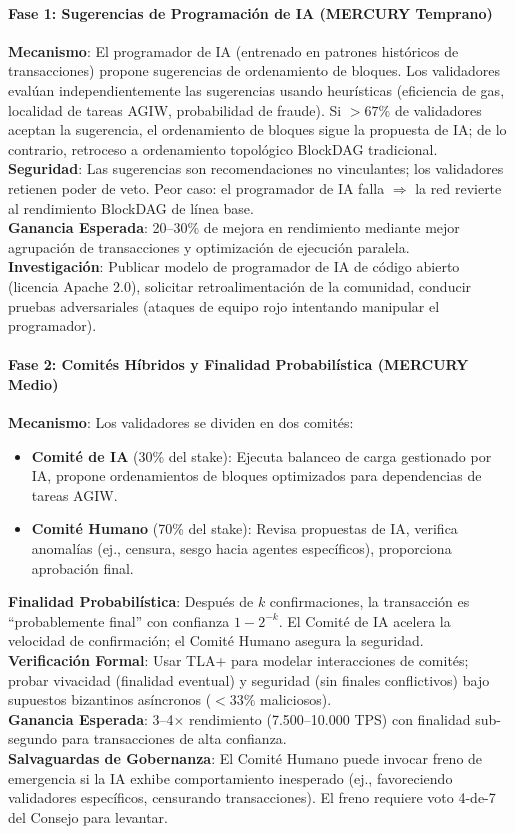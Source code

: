 \documentclass[11pt]{article}
\begin{document}
\paragraph{Fase 1: Sugerencias de Programación de IA (MERCURY Temprano)}
\textbf{Mecanismo}: El programador de IA (entrenado en patrones históricos de transacciones) propone sugerencias de ordenamiento de bloques. Los validadores evalúan independientemente las sugerencias usando heurísticas (eficiencia de gas, localidad de tareas AGIW, probabilidad de fraude). Si $>67\%$ de validadores aceptan la sugerencia, el ordenamiento de bloques sigue la propuesta de IA; de lo contrario, retroceso a ordenamiento topológico BlockDAG tradicional.\\
\textbf{Seguridad}: Las sugerencias son recomendaciones no vinculantes; los validadores retienen poder de veto. Peor caso: el programador de IA falla $\Rightarrow$ la red revierte al rendimiento BlockDAG de línea base.\\
\textbf{Ganancia Esperada}: 20--30\% de mejora en rendimiento mediante mejor agrupación de transacciones y optimización de ejecución paralela.\\
\textbf{Investigación}: Publicar modelo de programador de IA de código abierto (licencia Apache 2.0), solicitar retroalimentación de la comunidad, conducir pruebas adversariales (ataques de equipo rojo intentando manipular el programador).

\paragraph{Fase 2: Comités Híbridos y Finalidad Probabilística (MERCURY Medio)}
\textbf{Mecanismo}: Los validadores se dividen en dos comités:
\begin{itemize}[noitemsep]
  \item \textbf{Comité de IA} (30\% del stake): Ejecuta balanceo de carga gestionado por IA, propone ordenamientos de bloques optimizados para dependencias de tareas AGIW.
  \item \textbf{Comité Humano} (70\% del stake): Revisa propuestas de IA, verifica anomalías (ej., censura, sesgo hacia agentes específicos), proporciona aprobación final.
\end{itemize}
\textbf{Finalidad Probabilística}: Después de $k$ confirmaciones, la transacción es ``probablemente final'' con confianza $1 - 2^{-k}$. El Comité de IA acelera la velocidad de confirmación; el Comité Humano asegura la seguridad.\\
\textbf{Verificación Formal}: Usar TLA+ para modelar interacciones de comités; probar vivacidad (finalidad eventual) y seguridad (sin finales conflictivos) bajo supuestos bizantinos asíncronos ($<33\%$ maliciosos).\\
\textbf{Ganancia Esperada}: 3--4$\times$ rendimiento (7.500--10.000 TPS) con finalidad sub-segundo para transacciones de alta confianza.\\
\textbf{Salvaguardas de Gobernanza}: El Comité Humano puede invocar freno de emergencia si la IA exhibe comportamiento inesperado (ej., favoreciendo validadores específicos, censurando transacciones). El freno requiere voto 4-de-7 del Consejo para levantar.
\end{document}
